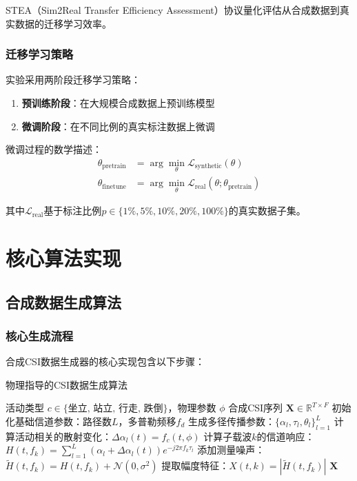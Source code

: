 STEA（Sim2Real Transfer Efficiency Assessment）协议量化评估从合成数据到真实数据的迁移学习效率。

\subsubsection{迁移学习策略}
实验采用两阶段迁移学习策略：

\begin{enumerate}
\item \textbf{预训练阶段}：在大规模合成数据上预训练模型
\item \textbf{微调阶段}：在不同比例的真实标注数据上微调
\end{enumerate}

微调过程的数学描述：
\begin{align}
\theta_{\text{pretrain}} &= \arg\min_\theta \mathcal{L}_{\text{synthetic}}(\theta) \\
\theta_{\text{finetune}} &= \arg\min_\theta \mathcal{L}_{\text{real}}(\theta; \theta_{\text{pretrain}})
\end{align}

其中$\mathcal{L}_{\text{real}}$基于标注比例$p \in \{1\%, 5\%, 10\%, 20\%, 100\%\}$的真实数据子集。

\section{核心算法实现}
\label{sec:algorithms}

\subsection{合成数据生成算法}
\label{subsec:synthetic_generation}

\subsubsection{核心生成流程}
合成CSI数据生成器的核心实现包含以下步骤：

\begin{algorithm}
\caption{物理指导的CSI数据生成算法}
\label{alg:csi_generation}
\begin{algorithmic}[1]
\REQUIRE 活动类型 $c \in \{\text{坐立, 站立, 行走, 跌倒}\}$，物理参数 $\phi$
\ENSURE 合成CSI序列 $\mathbf{X} \in \mathbb{R}^{T \times F}$
\STATE 初始化基础信道参数：路径数$L$，多普勒频移$f_d$
\STATE 生成多径传播参数：$\{\alpha_l, \tau_l, \theta_l\}_{l=1}^L$
    \STATE 计算活动相关的散射变化：$\Delta\alpha_l(t) = f_c(t, \phi)$
        \STATE 计算子载波$k$的信道响应：
        \STATE $H(t, f_k) = \sum_{l=1}^{L} (\alpha_l + \Delta\alpha_l(t)) e^{-j2\pi f_k \tau_l}$
    \ENDFOR
    \STATE 添加测量噪声：$\tilde{H}(t, f_k) = H(t, f_k) + \mathcal{N}(0, \sigma^2)$
    \STATE 提取幅度特征：$X(t, k) = |\tilde{H}(t, f_k)|$
\ENDFOR
\RETURN $\mathbf{X}$
\end{algorithmic}
\end{algorithm}

